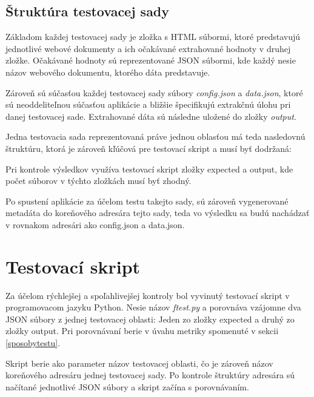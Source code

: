 \subsection{Štruktúra testovacej sady}

Základom každej testovacej sady je zložka s HTML súbormi, ktoré predstavujú jednotlivé webové dokumenty a ich očakávané extrahované hodnoty v druhej zložke. Očakávané hodnoty sú reprezentované JSON súbormi, kde každý nesie názov webového dokumentu, ktorého dáta predstavuje. 

Zároveň sú súčasťou každej testovacej sady súbory \textit{config.json} a \textit{data.json}, ktoré sú neoddeliteľnou súčasťou aplikácie a bližšie špecifikujú extrakčnú úlohu pri danej testovacej sade. Extrahované dáta sú následne uložené do zložky \textit{output}.

Jedna testovacia sada reprezentovaná práve jednou oblasťou má teda nasledovnú štruktúru, ktorá je zároveň kľúčová pre testovací skript a musí byť dodržaná:

\bigskip


\bigskip

Pri kontrole výsledkov využíva testovací skript zložky expected a output, kde počet súborov v týchto zložkách musí byť zhodný.

Po spustení aplikácie za účelom testu takejto sady, sú zároveň vygenerované metadáta do koreňového adresára tejto sady, teda vo výsledku sa budú nachádzať v rovnakom adresári ako config.json a data.json.


\section{Testovací skript}

Za účelom rýchlejšej a spoľahlivejšej kontroly bol vyvinutý testovací skript v programovacom jazyku Python. Nesie názov \textit{ftest.py} a porovnáva vzájomne dva JSON súbory z jednej testovacej oblasti: Jeden zo zložky expected a druhý zo zložky output. Pri porovnávaní berie v úvahu metriky spomenuté v sekcii \ref{sposobytestu}.

Skript berie ako parameter názov testovacej oblasti, čo je zároveň názov koreňového adresáru jednej testovacej sady. Po kontrole štruktúry adresára sú načítané jednotlivé JSON súbory a skript začína s porovnávaním.


